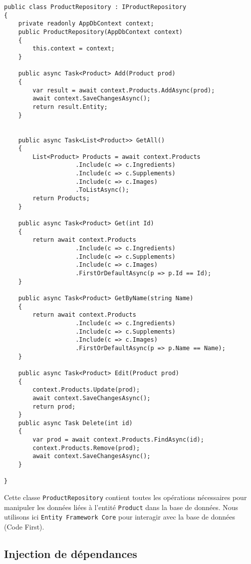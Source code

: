 \begin{lstlisting}[language=CSharp]
public class ProductRepository : IProductRepository
{
    private readonly AppDbContext context;
    public ProductRepository(AppDbContext context)
    {
        this.context = context;
    }

    public async Task<Product> Add(Product prod)
    {
        var result = await context.Products.AddAsync(prod);
        await context.SaveChangesAsync();
        return result.Entity;
    }


    public async Task<List<Product>> GetAll()
    {
        List<Product> Products = await context.Products
                    .Include(c => c.Ingredients)
                    .Include(c => c.Supplements)
                    .Include(c => c.Images)
                    .ToListAsync();
        return Products;
    }

    public async Task<Product> Get(int Id)
    {
        return await context.Products
                    .Include(c => c.Ingredients)
                    .Include(c => c.Supplements)
                    .Include(c => c.Images)
                    .FirstOrDefaultAsync(p => p.Id == Id);
    }

    public async Task<Product> GetByName(string Name)
    {
        return await context.Products
                    .Include(c => c.Ingredients)
                    .Include(c => c.Supplements)
                    .Include(c => c.Images)
                    .FirstOrDefaultAsync(p => p.Name == Name);
    }

    public async Task<Product> Edit(Product prod)
    {
        context.Products.Update(prod);
        await context.SaveChangesAsync();
        return prod;
    }
    public async Task Delete(int id)
    {
        var prod = await context.Products.FindAsync(id);
        context.Products.Remove(prod);
        await context.SaveChangesAsync();
    }

}
\end{lstlisting}

Cette classe \texttt{ProductRepository} contient toutes les opérations nécessaires pour manipuler les données liées à l’entité \texttt{Product} dans la base de données. Nous utilisons ici \texttt{Entity Framework Core} pour interagir avec la base de données (Code First).

\subsection{Injection de dépendances}

